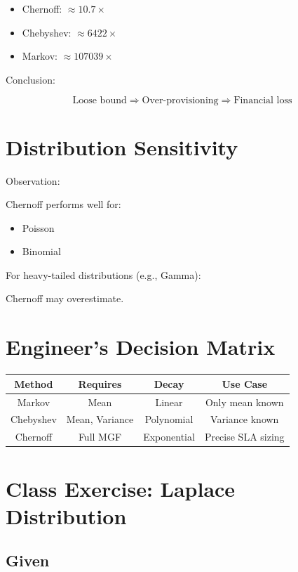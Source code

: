 \documentclass[11pt]{article}
\begin{document}
\begin{itemize}[noitemsep]
\item Chernoff: $\approx 10.7\times$
\item Chebyshev: $\approx 6422\times$
\item Markov: $\approx 107039\times$
\end{itemize}

Conclusion:

\[
\text{Loose bound} \Rightarrow \text{Over-provisioning} \Rightarrow \text{Financial loss}
\]

\section{Distribution Sensitivity}

Observation:

Chernoff performs well for:
\begin{itemize}[noitemsep]
\item Poisson
\item Binomial
\end{itemize}

For heavy-tailed distributions (e.g., Gamma):

Chernoff may overestimate.

\section{Engineer’s Decision Matrix}

\begin{center}
\begin{tabular}{c|c|c|c}
Method & Requires & Decay & Use Case \\ \hline
Markov & Mean & Linear & Only mean known \\
Chebyshev & Mean, Variance & Polynomial & Variance known \\
Chernoff & Full MGF & Exponential & Precise SLA sizing
\end{tabular}
\end{center}

\section{Class Exercise: Laplace Distribution}

\subsection{Given}
\end{document}
